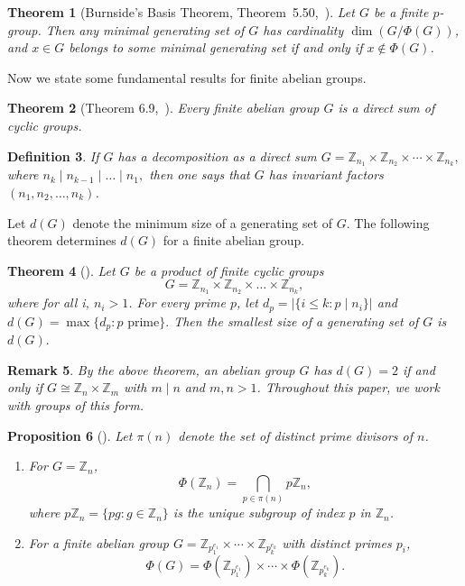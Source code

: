 \documentclass[11pt]{article}
\def \Z {{\mathbb Z}}
\newtheorem{theorem}{Theorem}[section]
\newtheorem{pro}[theorem]{Proposition}
\newtheorem{rem}[theorem]{Remark}
\newtheorem{definition}[theorem]{Definition}
\begin{document}
\begin{theorem}[Burnside's Basis Theorem, Theorem~5.50,~\cite{rotman}]
\label{thm:burnside}
Let $G$ be a finite $p$-group. Then any minimal generating set of $G$ has 
cardinality $\dim(G/\Phi(G))$, and $x \in G$ belongs to some minimal 
generating set if and only if $x \notin \Phi(G)$.
\end{theorem}

Now we state some fundamental results for finite abelian groups. 

 \begin{theorem}[Theorem 6.9,~\cite{rotman}]
Every finite abelian group $G$ is a direct sum of cyclic groups.
\end{theorem}
\begin{definition}
    If $G$ has a decomposition as a direct sum $G = \mathbb{Z}_{n_1} \times \mathbb{Z}_{n_2} \times \cdots \times 
    \mathbb{Z}_{n_k},$ where $n_k\mid n_{k-1}\mid\dots \mid n_1,$ then one says that $G$ has \emph{invariant factors} $(n_1,n_2,\dots,n_k)$. 
\end{definition}
 Let $d(G)$ denote the minimum size of a generating set of $G.$ The following theorem determines $d(G)$ for a finite abelian group.
\begin{theorem}[\cite{minabelian}]
    Let $G$ be a product of finite cyclic groups $$G= \Z_{n_1} \times \Z_{n_2}\times \dots \times \Z_{n_k},$$ where
    for all i, $n_i>1$. For every prime $p$, let $d_p=|\{i\leq  k : p\mid n_i\}|$ and
    $d(G) = \max\{d_p : p \text{ prime} \}.$
    Then the smallest size of a generating set of $G$ is $d(G).$
\end{theorem}

\begin{rem}
        By the above theorem, an abelian group $G$ has $d(G) = 2$ if and only if $G \cong 
        \mathbb{Z}_n \times \mathbb{Z}_m$ with $m \mid n$ and $m, n > 1$. 
        Throughout this paper, we work with groups of this form.
        \end{rem}

    \begin{pro}[\cite{rotman}]\label{pro:imp}
        Let $\pi(n)$ denote the set of distinct prime divisors of $n$.
        \begin{enumerate}
            \item For $G = \mathbb{Z}_n$,
            $$\Phi(\mathbb{Z}_n) = \bigcap_{p \in \pi(n)} p\mathbb{Z}_n,$$
            where $p\mathbb{Z}_n = \{pg : g \in \mathbb{Z}_n\}$ is the unique 
            subgroup of index $p$ in $\mathbb{Z}_n$.
        
            \item For a finite abelian group $G = \mathbb{Z}_{p_1^{e_1}} \times 
            \cdots \times \mathbb{Z}_{p_k^{e_k}}$ with distinct primes $p_i$,
            $$\Phi(G) = \Phi(\mathbb{Z}_{p_1^{e_1}}) \times \cdots \times 
            \Phi(\mathbb{Z}_{p_k^{e_k}}).$$
        \end{enumerate}
        \end{pro}
\end{document}
